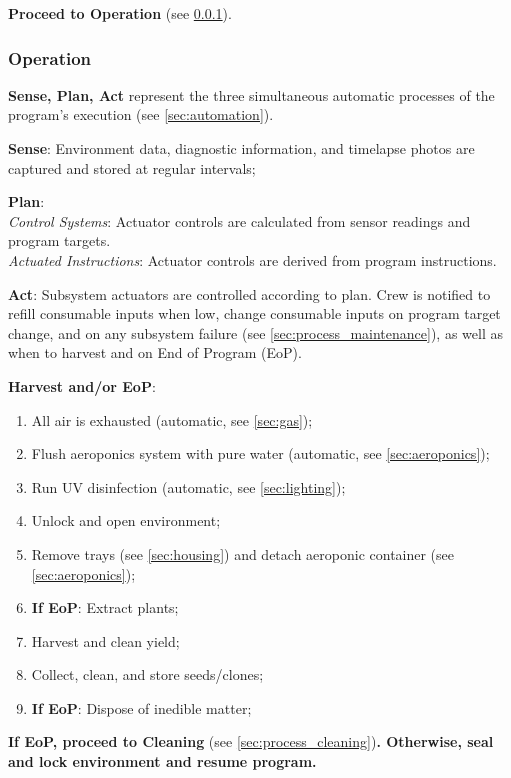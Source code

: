 \textbf{Proceed to Operation} (see \ref{sec:process_operation}).

\subsubsection{Operation}
\label{sec:process_operation}

\textbf{Sense, Plan, Act} represent the three simultaneous automatic processes of the program's execution (see \ref{sec:automation}).

\textbf{Sense}:
Environment data, diagnostic information, and timelapse photos are captured and stored at regular intervals;

\textbf{Plan}:\\
\textit{Control Systems}: Actuator controls are calculated from sensor readings and program targets.\\
\textit{Actuated Instructions}: Actuator controls are derived from program instructions.

\textbf{Act}:
Subsystem actuators are controlled according to plan. Crew is notified to refill consumable inputs when low, change consumable inputs on program target change, and on any subsystem failure (see \ref{sec:process_maintenance}), as well as when to harvest and on End of Program (EoP).

\clearpage

\textbf{Harvest and/or EoP}:
\begin{enumerate}
    \item All air is exhausted (automatic, see \ref{sec:gas});
    \item Flush aeroponics system with pure water (automatic, see \ref{sec:aeroponics});
    \item Run UV disinfection (automatic, see \ref{sec:lighting});
    \item Unlock and open environment;
    \item Remove trays (see \ref{sec:housing}) and detach aeroponic container (see \ref{sec:aeroponics});
    \item \textbf{If EoP}: Extract plants;
    \item Harvest and clean yield;
    \item Collect, clean, and store seeds/clones;
    \item \textbf{If EoP}: Dispose of inedible matter;
\end{enumerate}

\textbf{If EoP, proceed to Cleaning} (see \ref{sec:process_cleaning})\textbf{. Otherwise, seal and lock environment and resume program.}

